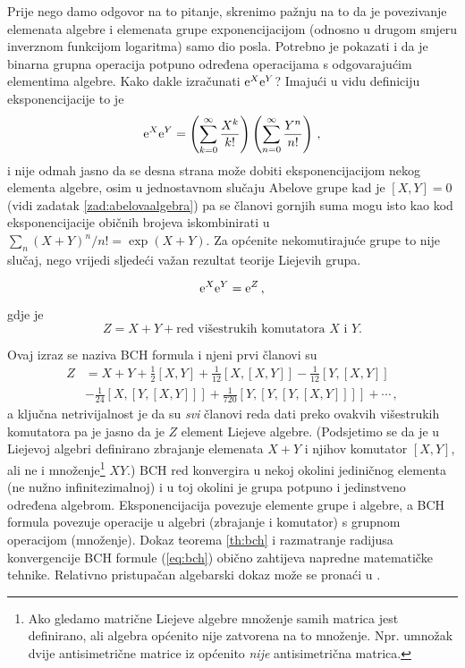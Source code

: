Prije nego damo odgovor na to pitanje, skrenimo pažnju na to da je
povezivanje elemenata algebre i elemenata grupe exponencijacijom
(odnosno u drugom smjeru inverznom funkcijom logaritma) samo dio
posla. Potrebno je pokazati i da je binarna grupna operacija potpuno
određena operacijama s odgovarajućim elementima algebre. Kako
dakle izračunati $\textrm{e}^X \textrm{e}^Y$? Imajući u vidu definiciju eksponencijacije
to je
\begin{equation}
   \textrm{e}^X \textrm{e}^Y = \left(\sum_{k=0}^{\infty} \frac{X^k}{k!}\right)
             \left(\sum_{n=0}^{\infty} \frac{Y^n}{n!}\right)
    \,,
\end{equation}
i nije odmah jasno da se desna strana može dobiti eksponencijacijom nekog
elementa algebre, osim u jednostavnom slučaju Abelove grupe kad je 
$[X, Y]=0$ (vidi zadatak \ref{zad:abelovaalgebra}) pa se članovi
gornjih suma mogu isto kao kod eksponencijacije običnih brojeva
iskombinirati u $\sum_n (X+Y)^{n}/n! = \exp(X+Y)$. Za općenite
nekomutirajuće grupe to nije slučaj, nego vrijedi sljedeći važan
rezultat teorije Liejevih grupa.
\begin{teorem} \label{th:bch}
     
    \[ \textrm{e}^X \textrm{e}^Y = \textrm{e}^Z \,, \]
  gdje je 
  \[ Z = X + Y + \text{red višestrukih komutatora $X$ i $Y$.} \]
\end{teorem}
Ovaj izraz se naziva BCH formula i njeni prvi članovi su
\begin{align}
    Z& = X + Y + \frac{1}{2}[X, Y] + \frac{1}{12}[X, [X, Y]] 
       - \frac{1}{12}[Y, [X, Y]] \nonumber \\
     &   - \frac{1}{24}[X, [Y, [X, Y]]] + \frac{1}{720}[Y, [Y, [Y, [X, Y]]]] 
         + \cdots \,,
   \label{eq:bch}
\end{align}
a ključna netrivijalnost je da su \emph{svi} članovi reda dati preko
ovakvih višestrukih komutatora pa je jasno da je $Z$ element Liejeve algebre.
(Podsjetimo se da je u Liejevoj algebri definirano zbrajanje elemenata $X+Y$ i njihov
 komutator $[X, Y]$, ali ne i množenje\footnote{Ako gledamo matrične
    Liejeve algebre množenje samih matrica jest definirano, ali algebra općenito nije zatvorena
    na to množenje. Npr. umnožak dvije antisimetrične matrice iz  
    općenito \emph{nije} antisimetrična matrica.} $X Y$.)
BCH red konvergira u nekoj okolini jediničnog elementa (ne nužno infinitezimalnoj)
i u toj okolini je grupa potpuno i jedinstveno određena algebrom.
Eksponencijacija povezuje elemente grupe i algebre, a BCH formula povezuje
operacije u algebri (zbrajanje i komutator) s grupnom operacijom (množenje).
Dokaz teorema \ref{th:bch}  i razmatranje radijusa konvergencije BCH formule (\ref{eq:bch}) 
obično zahtijeva napredne matematičke
tehnike. Relativno pristupačan algebarski dokaz može se pronaći
u \cite{Stilwell:2008}.

